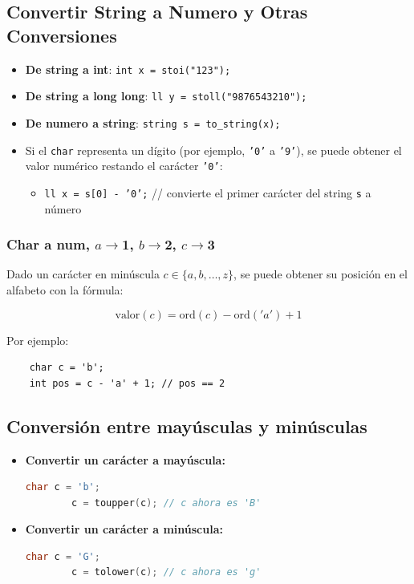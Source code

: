 \subsection{Convertir String a Numero y Otras Conversiones}
\begin{itemize}
	\item \textbf{De string a int}: \texttt{int x = stoi("123");}
	\item \textbf{De string a long long}: \texttt{ll y = stoll("9876543210");} 
	\item \textbf{De numero a string}: \texttt{string s = to\_string(x);}
\end{itemize}

\begin{itemize}
	\item Si el \texttt{char} representa un dígito (por ejemplo, \texttt{'0'} a \texttt{'9'}), se puede obtener el valor numérico restando el carácter \texttt{'0'}:
	\begin{itemize}
		\item \texttt{ll x = s[0] - '0';} \hfill // convierte el primer carácter del string \texttt{s} a número
	\end{itemize}

\end{itemize}
\subsubsection{Char a num, $a \to $1, $b \to $2, $c \to $3}
Dado un carácter en minúscula \( c \in \{a, b, \dots, z\} \), se puede obtener su posición en el alfabeto con la fórmula:

\[
\text{valor}(c) = \text{ord}(c) - \text{ord}('a') + 1
\]

Por ejemplo:
\begin{verbatim}
	char c = 'b';
	int pos = c - 'a' + 1; // pos == 2
\end{verbatim}

\subsection{Conversión entre mayúsculas y minúsculas}


\begin{itemize}
	\item \textbf{Convertir un carácter a mayúscula:}
	\begin{lstlisting}[language=C++]
		char c = 'b';
		c = toupper(c); // c ahora es 'B'
	\end{lstlisting}
	
	\item \textbf{Convertir un carácter a minúscula:}
	\begin{lstlisting}[language=C++]
		char c = 'G';
		c = tolower(c); // c ahora es 'g'
	\end{lstlisting}
\end{itemize}
